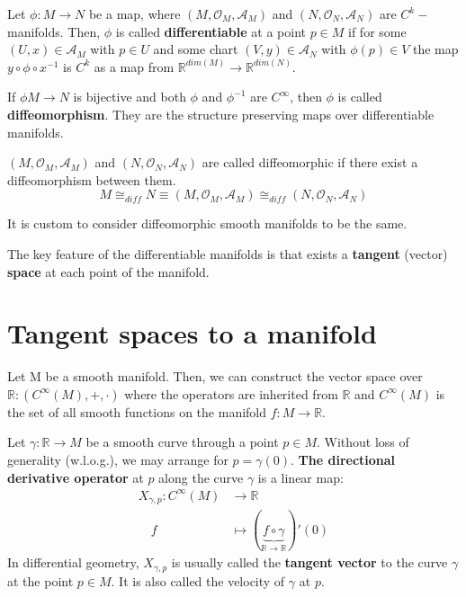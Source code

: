 \documentclass[root.tex]{subfiles}
\begin{document}
\begin{mydef}
  Let $\phi : M \to N$ be a map, where $(M, \mathcal{O}_M, \mathcal{A}_M)$ and $(N, \mathcal{O}_N, \mathcal{A}_N)$ are $C^k-$manifolds. Then, $\phi$ is called \textbf{differentiable} at a point $p \in M$ if for some $(U,x)\in \mathcal{A}_M$ with $p\in U$ and some chart $(V,y) \in \mathcal{A}_N$ with $\phi(p)\in V$ the map $y\circ \phi \circ x^{-1}$ is $C^k$ as a map from $\mathbb{R}^{dim(M)} \to \mathbb{R}^{dim(N)}$.
\end{mydef}
\begin{mydef}
  If $\phi M \to N$ is bijective and both $\phi$ and $\phi^{-1}$ are $C^\infty$, then $\phi$ is called \textbf{diffeomorphism}. They are the structure preserving maps over differentiable manifolds. 
\end{mydef}
\begin{mydef}
  $(M, \mathcal{O}_M, \mathcal{A}_M)$ and $(N, \mathcal{O}_N, \mathcal{A}_N)$ are called diffeomorphic if there exist a diffeomorphism between them.
  $$
  M \cong_{diff} N \equiv  (M, \mathcal{O}_M, \mathcal{A}_M) \cong_{diff}(N, \mathcal{O}_N, \mathcal{A}_N)
  $$
\end{mydef}
\begin{remark}
  It is custom to consider diffeomorphic smooth manifolds to be the same.
\end{remark}
\begin{remark}
  The key feature of the differentiable manifolds is that exists a \textbf{tangent} (vector) \textbf{space} at each point of the manifold.
\end{remark}

\section{Tangent spaces to a manifold}
\begin{mydef}
  Let M be a smooth manifold. Then, we can construct the vector space over $\mathbb{R}: (C^\infty(M), +, \cdot)$ where the operators are inherited from $\mathbb{R}$ and $C^\infty(M)$ is the set of all smooth functions on the manifold $f:M\to \mathbb{R}$.
\end{mydef}
\begin{mydef}
  Let $\gamma : \mathbb{R} \to M$ be a smooth curve through a point $p\in M$. Without loss of generality (w.l.o.g.), we may arrange for $p = \gamma(0)$. \textbf{ The directional derivative operator} at $p$ along the curve $\gamma$ is a linear map:
  $$
  \begin{aligned}
    X_{\gamma, p} : C^\infty(M) &\to \mathbb{R}\\
    \quad f    &\mapsto (\underbrace{f \circ \gamma}_{\mathbb{R}\to \mathbb{R}})'(0)
  \end{aligned}
  $$
  In differential geometry, $X_{\gamma, p}$ is usually called the \textbf{tangent vector} to the curve $\gamma$ at the point $p\in M$. It is also called the velocity of $\gamma$ at $p$.
\end{mydef}
\end{document}
